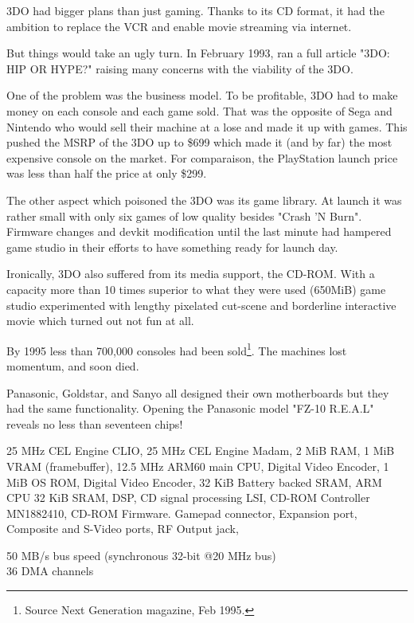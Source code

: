 \par
 3DO had bigger plans than just gaming. Thanks to its CD format, it had the ambition to replace the VCR and enable movie streaming via internet.\\
\par
But things would take an ugly turn. In February 1993,  ran a full article "3DO: HIP OR HYPE?" raising many concerns with the viability of the 3DO.\\
\par
One of the problem was the business model. To be profitable, 3DO had to make money on each console and each game sold. That was the opposite of Sega and Nintendo who would sell their machine at a lose and made it up with games. This pushed the MSRP of the 3DO up to \$699 which made it (and by far) the most expensive console on the market. For comparaison, the PlayStation launch price was less than half the price at only \$299.\\
\par
The other aspect which poisoned the 3DO was its game library. At launch it was rather small with only six games of low quality besides "Crash 'N Burn". Firmware changes and devkit modification until the last minute had hampered game studio in their efforts to have something ready for launch day.\\
\par
Ironically, 3DO also suffered from its media support, the CD-ROM. With a capacity more than 10 times superior to what they were used (650MiB) game studio experimented with lengthy pixelated cut-scene and borderline interactive movie which turned out not fun at all.\\
\par
By 1995 less than 700,000 consoles had been sold\footnote{Source Next Generation magazine, Feb 1995.}. The machines lost momentum, and soon died.


\par
Panasonic, Goldstar, and Sanyo all designed their own motherboards but they had the same functionality. Opening the  Panasonic model "FZ-10 R.E.A.L" reveals no less than seventeen chips!\\
\par
{} 25 MHz CEL Engine CLIO, 
 25 MHz CEL Engine  Madam, 
 2 MiB RAM, 
 1 MiB VRAM (framebuffer), 
 12.5 MHz ARM60 main CPU, 
 Digital Video Encoder, 
 1 MiB OS ROM, 
 Digital Video Encoder, 
 32 KiB Battery backed SRAM,  
 ARM CPU 32 KiB SRAM, 
 DSP, 
 CD signal processing LSI, 
 CD-ROM Controller MN1882410, 
 CD-ROM Firmware.
 Gamepad connector,
 Expansion port,
 Composite and S-Video ports, 
 RF Output jack, 
\par
50 MB/s bus speed (synchronous 32-bit @20 MHz bus)\\
36 DMA channels\\

